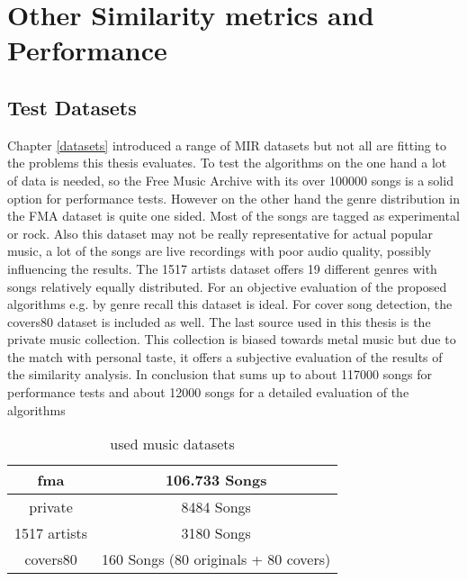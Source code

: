 
\chapter{Other Similarity metrics and Performance}\label{simmet}

\section{Test Datasets}

Chapter \ref{datasets} introduced a range of MIR datasets but not all are fitting to the problems this thesis evaluates. To test the algorithms on the one hand a lot of data is needed, so the Free Music Archive with its over 100000 songs is a solid option for performance tests. However on the other hand the genre distribution in the FMA dataset is quite one sided. Most of the songs are tagged as experimental or rock. Also this dataset may not be really representative for actual popular music, a lot of the songs are live recordings with poor audio quality, possibly influencing the results.
The 1517 artists dataset offers 19 different genres with songs relatively equally distributed. For an objective evaluation of the proposed algorithms e.g. by genre recall this dataset is ideal. For cover song detection, the covers80 dataset is included as well.
The last source used in this thesis is the private music collection. This collection is biased towards metal music but due to the match with personal taste, it offers a subjective evaluation of the results of the similarity analysis. 
In conclusion that sums up to about 117000 songs for performance tests and about 12000 songs for a detailed evaluation of the algorithms

\begin{table}[h]
	\caption{used music datasets}
	\label{used_dsets}
	\begin{center}
		\begin{tabular}{|c||c|}
			\hline
			fma & 106.733 Songs\\
			\hline
			private & 8484 Songs\\
			\hline
			1517 artists & 3180 Songs\\
			\hline
			covers80 & 160 Songs (80 originals + 80 covers)\\
			\hline
		\end{tabular}
	\end{center}
\end{table}

